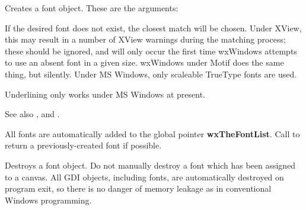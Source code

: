 
Creates a font object. These are the arguments:

\begin{twocollist}\itemsep=0pt
\end{twocollist}

If the desired font does not exist, the closest match will be chosen.
Under XView, this may result in a number of XView warnings during the
matching process; these should be ignored, and will only occur the first
time wxWindows attempts to use an absent font in a given size. wxWindows
under Motif does the same thing, but silently. Under MS Windows, only
scaleable TrueType fonts are used. 

Underlining only works under MS Windows at present.

See also , 
and .

All fonts are automatically added to the global pointer {\bf wxTheFontList}.
Call  to return
a previously-created font if possible.



Destroys a font object. Do not manually destroy a font which has been
assigned to a canvas. All GDI objects, including fonts, are
automatically destroyed on program exit, so there is no danger of memory
leakage as in conventional Windows programming.


